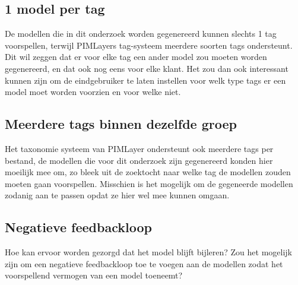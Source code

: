 \documentclass[a0,portrait]{a0poster}
\begin{document}
\begin{multicols}{2}
\subsection*{1 model per tag}
\color{black}
De modellen die in dit onderzoek worden gegenereerd kunnen slechts 1 tag voorspellen, terwijl PIMLayers tag-systeem meerdere soorten tags ondersteunt. Dit wil zeggen dat er voor elke tag een ander model zou moeten worden gegenereerd, en dat ook nog eens voor elke klant. Het zou dan ook interessant kunnen zijn om de eindgebruiker te laten instellen voor welk type tags er een model moet worden voorzien en voor welke niet.

\color{HoGentAccent1} 
\subsection*{Meerdere tags binnen dezelfde groep}
\color{black}
Het taxonomie systeem van PIMLayer ondersteunt ook meerdere tags per bestand, de modellen die voor dit onderzoek zijn gegenereerd konden hier moeilijk mee om, zo bleek uit de zoektocht naar welke tag de modellen zouden moeten gaan voorspellen. Misschien is het mogelijk om de gegeneerde modellen zodanig aan te passen opdat ze hier wel mee kunnen omgaan.  

\color{HoGentAccent1} 
\subsection*{Negatieve feedbackloop}
\color{black}
Hoe kan ervoor worden gezorgd dat het model blijft bijleren? Zou het mogelijk zijn om een negatieve feedbackloop toe te voegen aan de modellen zodat het voorspellend vermogen van een model toeneemt? 




\end{multicols}
\end{document}
